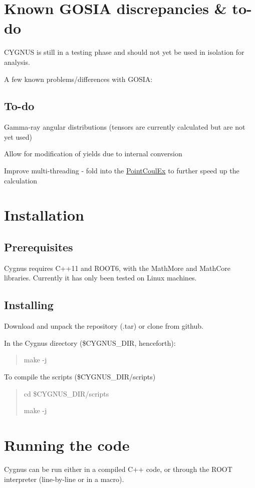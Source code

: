 \hypertarget{index_discrepancies}{}\section{Known G\-O\-S\-I\-A discrepancies \& to-\/do}\label{index_discrepancies}
C\-Y\-G\-N\-U\-S is still in a testing phase and should not yet be used in isolation for analysis.

A few known problems/differences with G\-O\-S\-I\-A\-:\hypertarget{index_todo}{}\subsection{To-\/do}\label{index_todo}
Gamma-\/ray angular distributions (tensors are currently calculated but are not yet used)

Allow for modification of yields due to internal conversion

Improve multi-\/threading -\/ fold into the \hyperlink{classPointCoulEx}{Point\-Coul\-Ex} to further speed up the calculation\hypertarget{index_install_sec}{}\section{Installation}\label{index_install_sec}
\hypertarget{index_prereq}{}\subsection{Prerequisites}\label{index_prereq}
Cygnus requires C++11 and R\-O\-O\-T6, with the Math\-More and Math\-Core libraries. Currently it has only been tested on Linux machines.\hypertarget{index_inst}{}\subsection{Installing}\label{index_inst}
Download and unpack the repository (.tar) or clone from github.

In the Cygnus directory (\$\-C\-Y\-G\-N\-U\-S\-\_\-\-D\-I\-R, henceforth)\-: \par
\begin{quotation}
make -\/j

\end{quotation}


To compile the scripts (\$\-C\-Y\-G\-N\-U\-S\-\_\-\-D\-I\-R/scripts) \begin{quotation}
cd \$\-C\-Y\-G\-N\-U\-S\-\_\-\-D\-I\-R/scripts \par
make -\/j

\end{quotation}
\hypertarget{index_running}{}\section{Running the code}\label{index_running}
Cygnus can be run either in a compiled C++ code, or through the R\-O\-O\-T interpreter (line-\/by-\/line or in a macro).

